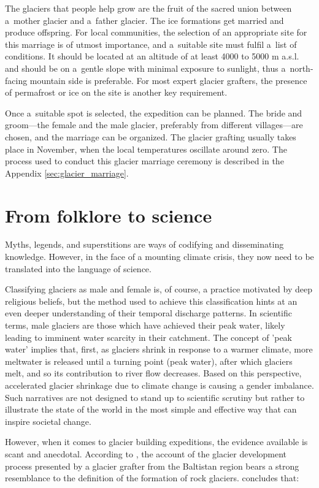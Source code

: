 The glaciers that people help grow are the fruit of the sacred union between a mother glacier and a father
glacier. The ice formations get married and produce offspring. For local communities, the selection of an
appropriate site for this marriage is of utmost importance, and a suitable site must fulfil a list of
conditions. It should be located at an altitude of at least 4000 to 5000 m \ac{a.s.l.} and should be on
a gentle slope with minimal exposure to sunlight, thus a north-facing mountain side is
preferable. For most expert glacier grafters, the presence of permafrost or ice on the site is another key
requirement. 

Once a suitable spot is selected, the expedition can be planned. The bride and groom---the female and the male
glacier, preferably from different villages---are chosen, and the marriage can be organized. The glacier grafting
usually takes place in November, when the local temperatures oscillate around zero. The process used to conduct
this glacier marriage ceremony is described in the Appendix \ref{sec:glacier_marriage}.

\section{From folklore to science}

Myths, legends, and superstitions are ways of codifying and disseminating knowledge. However, in the face of a
mounting climate crisis, they now need to be translated into the language of science. 

Classifying glaciers as male and female is, of course, a practice motivated by deep religious beliefs, but the
method used to achieve this classification hints at an even deeper understanding of their temporal discharge
patterns. In scientific terms, male glaciers are those which have achieved their peak water, likely leading to
imminent water scarcity in their catchment. The concept of 'peak water' implies that, first, as glaciers shrink
in response to a warmer climate, more meltwater is released until a turning point (peak water), after which
glaciers melt, and so its contribution to river flow decreases. Based on this perspective, accelerated glacier
shrinkage due to climate change is causing a gender imbalance. Such narratives are not designed to stand up to
scientific scrutiny but rather to illustrate the state of the world in the most simple and effective way that
can inspire societal change. 

However, when it comes to glacier building expeditions, the evidence available is scant and anecdotal. According
to \citet{tveitenGlacierGrowingLocal2007}, the account of the glacier development process presented by a glacier
grafter from the Baltistan region bears a strong resemblance to the definition of the formation of rock glaciers.
\citet{tveitenGlacierGrowingLocal2007} concludes that: 

